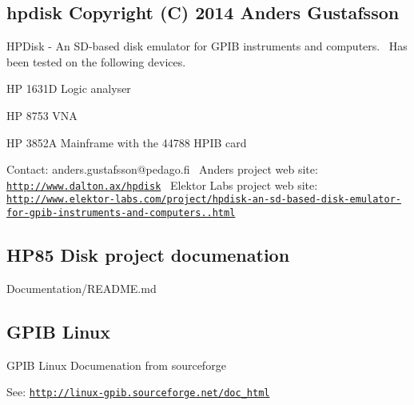 \subsection*{hpdisk Copyright (C) 2014 Anders Gustafsson}

H\+P\+Disk -\/ An S\+D-\/based disk emulator for G\+P\+IB instruments and computers.~\newline
 Has been tested on the following devices.
\begin{DoxyItemize}
\item HP 1631D Logic analyser
\item HP 8753 V\+NA
\item HP 3852A Mainframe with the 44788 H\+P\+IB card
\end{DoxyItemize}

Contact\+: anders.\+gustafsson@pedago.\+fi~\newline
 Anders project web site\+: \href{http://www.dalton.ax/hpdisk}{\tt http\+://www.\+dalton.\+ax/hpdisk}~\newline
 Elektor Labs project web site\+: \href{http://www.elektor-labs.com/project/hpdisk-an-sd-based-disk-emulator-for-gpib-instruments-and-computers.13693.html}{\tt http\+://www.\+elektor-\/labs.\+com/project/hpdisk-\/an-\/sd-\/based-\/disk-\/emulator-\/for-\/gpib-\/instruments-\/and-\/computers..\+html} 



\subsection*{H\+P85 Disk project documenation}


\begin{DoxyItemize}
\item Documentation/\+R\+E\+A\+D\+M\+E.\+md 


\end{DoxyItemize}

\subsection*{G\+P\+IB Linux}


\begin{DoxyItemize}
\item G\+P\+IB Linux Documenation from sourceforge
\begin{DoxyItemize}
\item See\+: \href{http://linux-gpib.sourceforge.net/doc_html}{\tt http\+://linux-\/gpib.\+sourceforge.\+net/doc\+\_\+html} 


\end{DoxyItemize}
\end{DoxyItemize}

